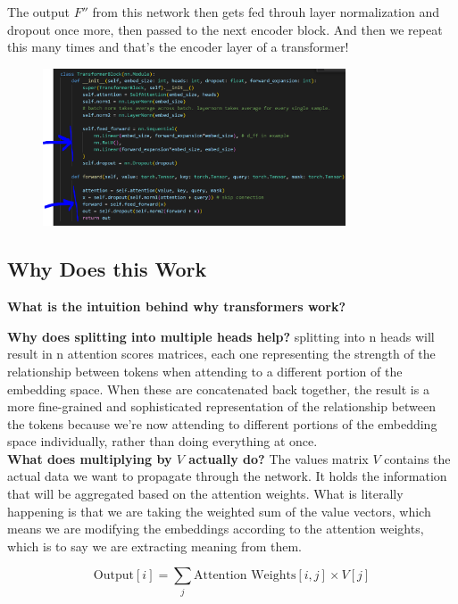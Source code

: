 \documentclass[12pt]{article}
\begin{document}
\begin{enumerate}
The output  \(F''\)  from this network then gets fed throuh layer normalization and dropout once more, then passed to the next encoder block. And then we repeat this many times and that's the encoder layer of a transformer!
\begin{figure}[H]
    \centering
    \includegraphics[width=0.8\textwidth]{./ffnn_encoder.png}
\end{figure}
\end{enumerate}


\subsection{Why Does this Work}

\textbf{What is the intuition behind why transformers work?}

\textbf{Why does splitting into multiple heads help?} 
splitting into n heads will result in n attention scores matrices, each one representing the strength of the relationship between tokens when attending to a different portion of the embedding space. When these are concatenated back together, the result is a more fine-grained and sophisticated representation of the relationship between the tokens because we're now attending to different portions of the embedding space individually, rather than doing everything at once. \\

\textbf{What does multiplying by \(V\) actually do?}
The values matrix \(V\) contains the actual data we want to propagate through the network. It holds the information that will be aggregated based on the attention weights. What is literally happening is that we are taking the weighted sum of the value vectors, which means we are modifying the embeddings according to the attention weights, which is to say we are extracting meaning from them.

\[
\text{Output}[i] = \sum_j \text{Attention Weights}[i, j] \times V[j]
\]
\end{document}
